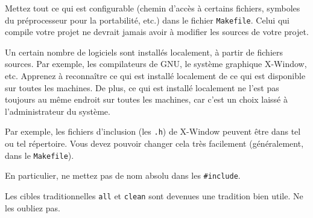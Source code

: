 
Mettez tout ce qui est configurable (chemin d'accès à certains fichiers,
symboles du préprocesseur pour la portabilité, etc.) dans le fichier
{\tt Makefile}. Celui qui compile votre projet ne devrait jamais
avoir à modifier les sources de votre projet.



Un certain nombre de logiciels sont installés localement, à partir
de fichiers sources. Par exemple, les compilateurs de GNU, le système
graphique X-Window, etc. Apprenez à reconnaître ce qui est installé
localement de ce qui est disponible sur toutes les machines.
De plus, ce qui est installé localement ne l'est pas toujours au
même endroit sur toutes les machines, car c'est un choix laissé à
l'administrateur du système.

Par exemple, les fichiers d'inclusion (les \verb|.h|)  de X-Window
peuvent être dans tel ou tel répertoire. Vous devez pouvoir changer
cela très facilement (généralement, dans le {\tt Makefile}).

En particulier, ne mettez pas de nom absolu dans les {\tt \#include}.



Les cibles traditionnelles {\tt all} et {\tt clean} sont devenues
une tradition bien utile.  Ne les oubliez pas.
